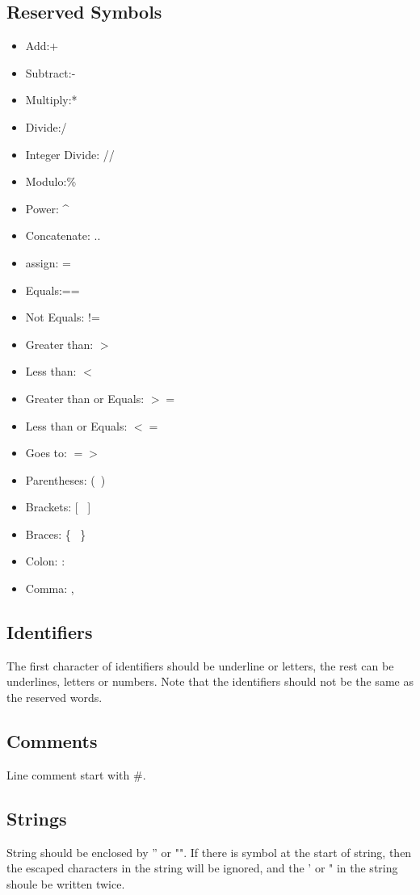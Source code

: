\documentclass[]{article}
\begin{document}
\subsection{Reserved Symbols}
\begin{itemize}
	\item Add:+
	\item Subtract:- 
	\item Multiply:*
	\item Divide:/
	\item Integer Divide: //
	\item Modulo:\%
	\item Power: \^{}
	\item Concatenate: ..
	\item assign: =
	\item Equals:==
	\item Not Equals: !=
	\item Greater than: $>$
	\item Less than: $<$
	\item Greater than or Equals: $>=$
	\item Less than or Equals: $<=$
	\item Goes to: $=>$
	\item Parentheses: (\ )
	\item Brackets: [ \  ]
	\item Braces: \{ \ \}
	\item Colon: :
	\item Comma: ,
\end{itemize}
\subsection{Identifiers}
The first character of identifiers should be underline or letters, the rest can be underlines, letters or numbers.
Note that the identifiers should not be the same as the reserved words.

\subsection{Comments}
Line comment start with \#.

\subsection{Strings}
String should be enclosed by '' or "". If there is symbol \@ at the start of string, then the escaped characters in the string will be ignored, and the ' or " in the string shoule be written twice.
\end{document}
